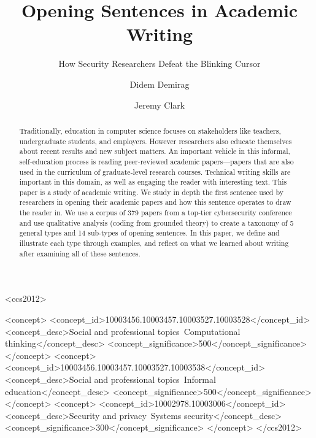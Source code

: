 \documentclass[sigconf]{acmart}
\begin{document}
\fancyhead{}

\title{Opening Sentences in Academic Writing}
\subtitle{How Security Researchers Defeat the Blinking Cursor}

\author{Didem Demirag}
\author{Jeremy Clark}

\begin{abstract}

Traditionally, education in computer science focuses on stakeholders like teachers, undergraduate students, and employers. However researchers also educate themselves about recent results and new subject matters. An important vehicle in this informal, self-education process is reading peer-reviewed academic papers---papers that are also used in the curriculum of graduate-level research courses. Technical writing skills are important in this domain, as well as engaging the reader with interesting text. This paper is a study of academic writing. We study in depth the first sentence used by researchers in opening their academic papers and how this sentence operates to draw the reader in. We use a corpus of 379 papers from a top-tier cybersecurity conference and use qualitative analysis (coding from grounded theory) to create a taxonomy of 5 general types and 14 sub-types of opening sentences. In this paper, we define and illustrate each type through examples, and reflect on what we learned about writing after examining all of these sentences.

\end{abstract}

\begin{CCSXML}
<ccs2012>

   <concept>
       <concept_id>10003456.10003457.10003527.10003528</concept_id>
       <concept_desc>Social and professional topics~Computational thinking</concept_desc>
       <concept_significance>500</concept_significance>
       </concept>
       <concept>
<concept_id>10003456.10003457.10003527.10003538</concept_id>
<concept_desc>Social and professional topics~Informal education</concept_desc>
<concept_significance>500</concept_significance>
</concept>
   <concept>
       <concept_id>10002978.10003006</concept_id>
       <concept_desc>Security and privacy~Systems security</concept_desc>
       <concept_significance>300</concept_significance>
       </concept>
 </ccs2012>
\end{CCSXML}
\end{document}
